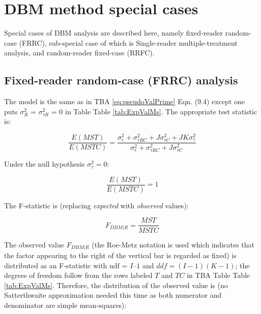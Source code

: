 \documentclass[
]{book}
\begin{document}
\hypertarget{DBMSpecialCases}{%
\chapter{DBM method special cases}\label{DBMSpecialCases}}

Special cases of DBM analysis are described here, namely fixed-reader random-case (FRRC), sub-special case of which is Single-reader multiple-treatment analysis, and random-reader fixed-case (RRFC).

\hypertarget{FRRCDBMAnalysis}{%
\section{Fixed-reader random-case (FRRC) analysis}\label{FRRCDBMAnalysis}}

The model is the same as in TBA \eqref{eq:pseudoValPrime} Eqn. (9.4) except one puts \(\sigma_{R}^{2}\) = \(\sigma_{\tau R}^{2}\) = 0 in Table Table \ref{tab:ExpValMs}. The appropriate test statistic is:

\begin{equation}
\frac{E\left ( MST \right )}{E\left ( MSTC \right )} = \frac{\sigma_{\epsilon}^{2}+\sigma_{\tau RC}^{2}+J\sigma_{\tau C}^{2}+JK\sigma_{\tau}^{2}}{\sigma_{\epsilon}^{2}+\sigma_{\tau RC}^{2}+J\sigma_{\tau C}^{2}}
\end{equation}

Under the null hypothesis \(\sigma_{\tau}^{2} = 0\):

\begin{equation}
\frac{E\left ( MST \right )}{E\left ( MSTC \right )} = 1
\end{equation}

The F-statistic is (replacing \emph{expected} with \emph{observed} values):

\begin{equation}
F_{DBM|R}=\frac{MST}{MSTC}
\label{eq:FStatFRRC-DBM}
\end{equation}

The observed value \(F_{DBM|R}\) (the Roe-Metz notation \citep{RN1124} is used which indicates that the factor appearing to the right of the vertical bar is regarded as fixed) is distributed as an F-statistic with \(\text{ndf}\) = \(I – 1\) and \(ddf = (I-1)(K-1)\); the degrees of freedom follow from the rows labeled \(T\) and \(TC\) in TBA Table Table \ref{tab:ExpValMs}. Therefore, the distribution of the observed value is (no Satterthwaite approximation needed this time as both numerator and denominator are simple mean-squares):
\end{document}
